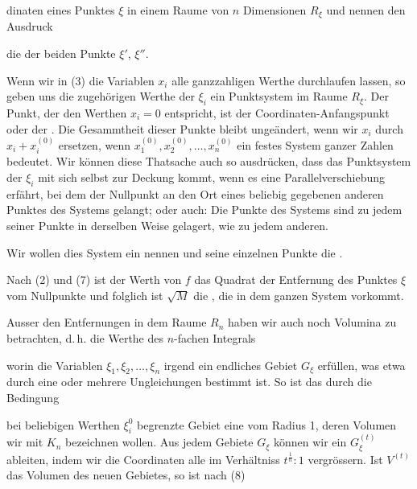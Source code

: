 dinaten eines Punktes $\xi$ in einem Raume von $n$ Dimensionen
$R_\xi$ und nennen den Ausdruck


die  der beiden Punkte $\xi'$, $\xi''$.

Wenn wir in (3) die Variablen $x_i$ alle ganzzahligen Werthe
durchlaufen lassen, so geben uns die zugehörigen Werthe der $\xi_i$
ein Punktsystem im Raume $R_\xi$. Der Punkt, der den Werthen $x_i =
0$ entspricht, ist der Coordinaten-Anfangspunkt oder der .
Die Gesammtheit dieser Punkte bleibt ungeändert, wenn wir $x_i$
durch $x_i + x_i^{(0)}$ ersetzen, wenn $x_1^{(0)}, x_2^{(0)}, \ldots,
x_n^{(0)}$ ein festes System ganzer Zahlen bedeutet. Wir können diese
Thatsache auch so ausdrücken, dass das Punktsystem der $\xi_i$ mit
sich selbst zur Deckung kommt, wenn es eine Parallelverschiebung
erfährt, bei dem der Nullpunkt an den Ort eines beliebig gegebenen
anderen Punktes des Systems gelangt; oder auch: Die Punkte des
Systems sind zu jedem seiner Punkte in derselben Weise gelagert, wie
zu jedem anderen.

Wir wollen dies System ein  nennen und seine
einzelnen Punkte die .

Nach (2) und (7) ist der Werth von $f$ das Quadrat der Entfernung des
Punktes $\xi$ vom Nullpunkte und folglich ist $\sqrt{M}$ die
, die in dem ganzen System
vorkommt.

Ausser den Entfernungen in dem Raume $R_n$ haben wir auch noch
Volumina zu betrachten, d.\,h. die Werthe des $n$-fachen Integrals


worin die Variablen $\xi_1, \xi_2, \ldots, \xi_n$ irgend ein
endliches Gebiet $G_\xi$ erfüllen, was etwa durch eine oder mehrere
Ungleichungen bestimmt ist. So ist das durch die Bedingung


bei beliebigen Werthen $\xi_i^0$ begrenzte Gebiet eine
 vom Radius 1, deren Volumen wir mit $K_n$
bezeichnen wollen. Aus jedem Gebiete $G_\xi$ können wir ein
 $G_\xi^{(t)}$ ableiten, indem wir die Coordinaten
alle im Verhältniss $t^{\frac{1}{n}} : 1$ vergrössern. Ist $V^{(t)}$
das Volumen des neuen Gebietes, so ist nach (8)

